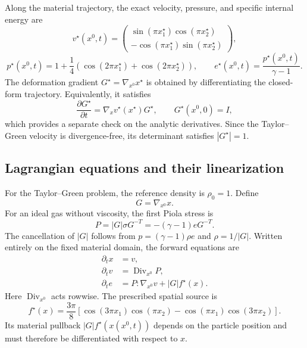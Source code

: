 \documentclass[11pt]{article}
\begin{document}
Along the material trajectory, the exact velocity, pressure, and specific
internal energy are
\[
 v^\star(x^0,t)=
 \begin{pmatrix}
  \sin(\pi x_1^\star)\cos(\pi x_2^\star)\\
  -\cos(\pi x_1^\star)\sin(\pi x_2^\star)
 \end{pmatrix},
\]
\[
 p^\star(x^0,t)
 =1+\frac14\left(\cos(2\pi x_1^\star)+\cos(2\pi x_2^\star)\right),
 \qquad
 e^\star(x^0,t)=\frac{p^\star(x^0,t)}{\gamma-1}.
\]
The deformation gradient
$G^\star=\nabla_{x^0}x^\star$ is obtained by differentiating the closed-form
trajectory.  Equivalently, it satisfies
\[
 \frac{\partial G^\star}{\partial t}
 =\nabla_x v^\star(x^\star)G^\star,
 \qquad G^\star(x^0,0)=I,
\]
which provides a separate check on the analytic derivatives.  Since the
Taylor--Green velocity is divergence-free, its determinant satisfies
$|G^\star|=1$.

\subsection{Lagrangian equations and their linearization}

For the Taylor--Green problem, the reference density is $\rho_0=1$.  Define
\[
 G=\nabla_{x^0}x.
\]
For an ideal gas without viscosity, the first Piola stress is
\[
 P=|G|\sigma G^{-T}=-(\gamma-1)eG^{-T}.
\]
The cancellation of $|G|$ follows from
$p=(\gamma-1)\rho e$ and $\rho=1/|G|$.  Written entirely on the fixed material
domain, the forward equations are
\begin{align}
 \partial_t x&=v,\label{eq:direct-lagrangian-x}\\
 \partial_t v&=\operatorname{Div}_{x^0}P,
 \label{eq:direct-lagrangian-v}\\
 \partial_t e&=P:\nabla_{x^0}v+|G|f^\star(x).
 \label{eq:direct-lagrangian-e}
\end{align}
Here $\operatorname{Div}_{x^0}$ acts rowwise.  The prescribed spatial source is
\[
 f^\star(x)=\frac{3\pi}{8}\left[
 \cos(3\pi x_1)\cos(\pi x_2)
 -\cos(\pi x_1)\cos(3\pi x_2)\right].
\]
Its material pullback $|G|f^\star(x(x^0,t))$ depends on the particle position and
must therefore be differentiated with respect to $x$.
\end{document}

